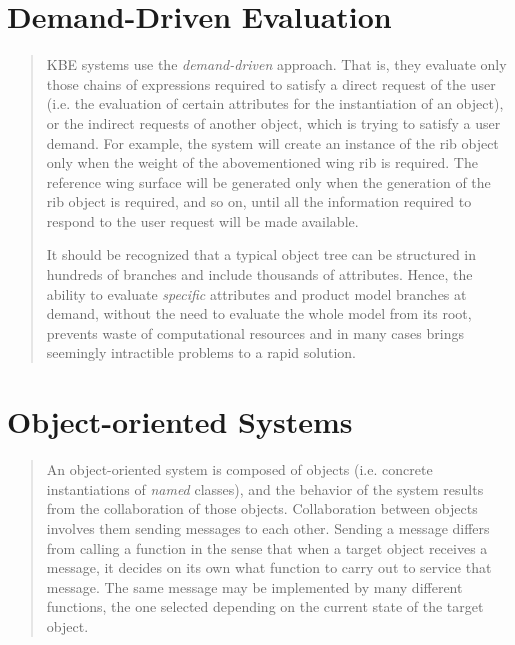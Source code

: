\documentclass [11pt]{book}
\begin{document}
\section{Demand-Driven Evaluation}

\label{sec:demand-drivenevaluation}



\begin{quote}
KBE systems use the \emph{demand-driven} approach. That is, they evaluate only those chains of
expressions required to satisfy a direct request of the user (i.e. the
evaluation of certain attributes for the instantiation of an object),
or the indirect requests of another object, which is trying to satisfy
a user demand. For example, the system will create an instance of the
rib object only when the weight of the abovementioned wing rib is
required. The reference wing surface will be generated only when the
generation of the rib object is required, and so on, until all the
information required to respond to the user request will be made
available.

It should be recognized that a typical object tree can be structured
in hundreds of branches and include thousands of attributes. Hence,
the ability to evaluate \emph{specific} attributes and product model branches at demand, without the
need to evaluate the whole model from its root, prevents waste of
computational resources and in many cases brings seemingly intractible
problems to a rapid solution.

\end{quote}


\section{Object-oriented Systems}

\label{sec:object-orientedsystems}



\begin{quote}
An object-oriented system is composed of
       objects (i.e. concrete instantiations of \emph{named} classes), and the behavior of the system results from
       the collaboration of those objects. Collaboration between
       objects involves them sending messages to each other. Sending a
       message differs from calling a function in the sense that when
       a target object receives a message, it decides on its own what
       function to carry out to service that message. The same message
       may be implemented by many different functions, the one
       selected depending on the current state of the target
       object.

\end{quote}
\end{document}
